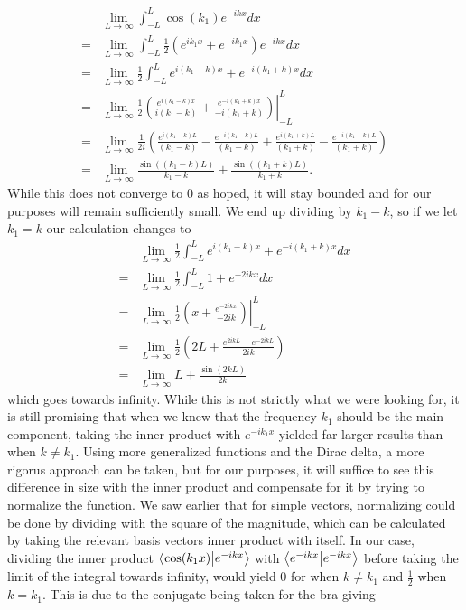 \begin{align*}
    &\lim_{L\rightarrow \infty} \int_{-L}^L \cos(k_1)e^{-ikx}dx\\
    =&\lim_{L\rightarrow \infty} \int_{-L}^L \frac{1}{2}(e^{ik_1x}+e^{-ik_1x})e^{-ikx}dx\\
    = &\lim_{L\rightarrow \infty} \frac{1}{2}\int_{-L}^L e^{i(k_1-k)x}+e^{-i(k_1+k)x}dx\\
    = &\lim_{L\rightarrow \infty} \left.\frac{1}{2} \left(     
     \frac{e^{i(k_1-k)x}}{i(k_1-k)}+\frac{e^{-i(k_1+k)x}}{-i(k_1+k)} \right)\right\rvert_{-L}^L\\
     = &\lim_{L\rightarrow \infty} \frac{1}{2i}\left( \frac{e^{i(k_1-k)L}}{(k_1-k)}- \frac{e^{-i(k_1-k)L}}{(k_1-k)} + \frac{e^{i(k_1+k)L}}{(k_1+k)}- \frac{e^{-i(k_1+k)L}}{(k_1+k)}\right)\\
     = &\lim_{L\rightarrow \infty} \frac{\sin((k_1-k)L)}{k_1-k} + \frac{\sin((k_1+k)L)}{k_1+k}.
\end{align*} While this does not converge to 0 as hoped, it will stay bounded and for our purposes will remain sufficiently small. We end up dividing by $k_1-k$, so if we let $k_1=k$ our calculation changes to 
\begin{align*}
    &\lim_{L\rightarrow \infty} \frac{1}{2}\int_{-L}^L e^{i(k_1-k)x}+e^{-i(k_1+k)x}dx\\
    =&\lim_{L\rightarrow \infty} \frac{1}{2}\int_{-L}^L 1+e^{-2ikx}dx\\
    =&\lim_{L\rightarrow \infty} \frac{1}{2}\left.\left( x+\frac{e^ {-2ikx}}{-2ik}\right)\right\rvert_{-L}^L\\
    =&\lim_{L\rightarrow \infty}\frac{1}{2}\left(2L+\frac{e^{2ikL}-e^{-2ikL}}{2ik}\right)\\
    =&\lim_{L\rightarrow \infty} L + \frac{\sin(2kL)}{2k}
\end{align*} which goes towards infinity. While this is not strictly what we were looking for, it is still promising that when we knew that the frequency $k_1$ should be the main component, taking the inner product with $e^{-ik_1x}$  yielded far larger results than when $k\not=k_1$. Using more generalized functions and the Dirac delta, a more rigorus approach can be taken, but for our purposes, it will suffice to see this difference in size with the inner product and compensate for it by trying to normalize the function. We saw earlier that for simple vectors, normalizing could be done by dividing with the square of the magnitude, which can be calculated by taking the relevant basis vectors inner product with itself. In our case, dividing the inner product $\braket{\cos(k_1x)}{e^{-ikx}}$ with $\braket{e^{-ikx}}{e^{-ikx}}$ before taking the limit of the integral towards infinity, would yield 0 for when $k\not=k_1$ and $\frac{1}{2}$ when $k=k_1$. This is due to the conjugate being taken for the bra giving

